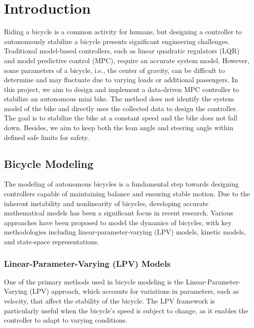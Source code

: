 \chapter{Introduction}

Riding a bicycle is a common activity for humans, but designing a controller to autonomously stabilize a bicycle presents significant engineering challenges.
Traditional model-based controllers, such as linear quadratic regulators (LQR) and model predictive control (MPC), require an accurate system model. 
However, some parameters of a bicycle, i.e., the center of gravity, can be difficult to determine and may fluctuate due to varying loads or additional passengers. 
In this project, we aim to design and implement a data-driven MPC controller to stabilize an autonomous mini bike. 
The method does not identify the system model of the bike and directly uses the collected data to design the controller. The goal is to stabilize the bike at a constant speed and the bike does not fall down. 
Besides, we aim to keep both the lean angle and steering angle within defined safe limits for safety.


\section{Bicycle Modeling}

	The modeling of autonomous bicycles is a fundamental step towards designing controllers capable of maintaining balance and ensuring stable motion. Due to the inherent instability and nonlinearity of bicycles, developing accurate mathematical models has been a significant focus in recent research. Various approaches have been proposed to model the dynamics of bicycles, with key methodologies including linear-parameter-varying (LPV) models, kinetic models, and state-space representations.
	
	\subsection{Linear-Parameter-Varying (LPV) Models}
	One of the primary methods used in bicycle modeling is the Linear-Parameter-Varying (LPV) approach, which accounts for variations in parameters, such as velocity, that affect the stability of the bicycle. The LPV framework is particularly useful when the bicycle's speed is subject to change, as it enables the controller to adapt to varying conditions.
	
